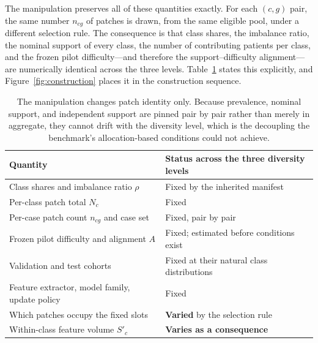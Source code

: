 \documentclass[11pt]{article}
\begin{document}
The manipulation preserves all of these quantities exactly. For each $(c,g)$ pair, the same number $n_{cg}$ of patches is drawn, from the same eligible pool, under a different selection rule. The consequence is that class shares, the imbalance ratio, the nominal support of every class, the number of contributing patients per class, and the frozen pilot difficulty---and therefore the support--difficulty alignment---are numerically identical across the three levels. Table~\ref{tab:fixed-varied} states this explicitly, and Figure~\ref{fig:construction} places it in the construction sequence.

\begin{table}[H]
  \centering
  \small
  \begin{tabularx}{\linewidth}{@{}l>{\raggedright\arraybackslash}X@{}}
    \toprule
    Quantity & Status across the three diversity levels \\
    \midrule
    Class shares and imbalance ratio $\rho$ & Fixed by the inherited manifest \\
    Per-class patch total $N_c$ & Fixed \\
    Per-case patch count $n_{cg}$ and case set & Fixed, pair by pair \\
    Frozen pilot difficulty and alignment $A$ & Fixed; estimated before conditions exist \\
    Validation and test cohorts & Fixed at their natural class distributions \\
    Feature extractor, model family, update policy & Fixed \\
    \midrule
    Which patches occupy the fixed slots & \textbf{Varied} by the selection rule \\
    Within-class feature volume $S'_c$ & \textbf{Varies as a consequence} \\
    \bottomrule
  \end{tabularx}
  \caption{The manipulation changes patch identity only. Because prevalence, nominal support, and independent support are pinned pair by pair rather than merely in aggregate, they cannot drift with the diversity level, which is the decoupling the benchmark's allocation-based conditions could not achieve.}
  \label{tab:fixed-varied}
\end{table}
\end{document}
